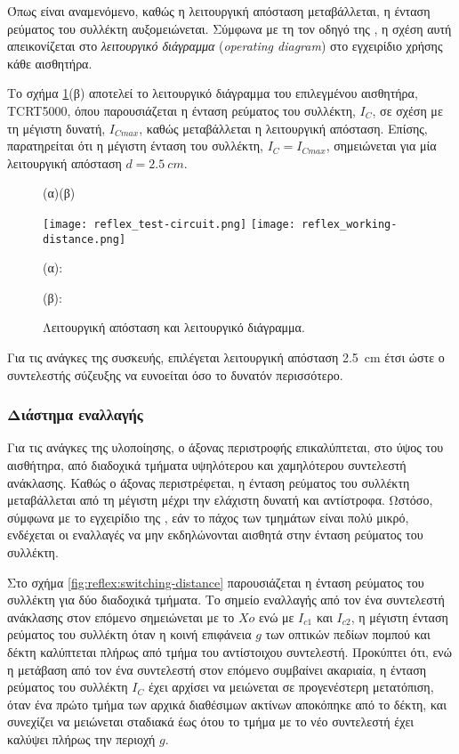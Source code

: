 Όπως είναι αναμενόμενο, καθώς η λειτουργική απόσταση μεταβάλλεται, η ένταση
ρεύματος του συλλέκτη αυξομειώνεται. Σύμφωνα με τη τον οδηγό της
\textcite{vishay06}, η σχέση αυτή απεικονίζεται στο \emph{λειτουργικό διάγραμμα}
 (\emph{operating diagram}) στο εγχειρίδιο χρήσης
κάθε αισθητήρα.

Το σχήμα \ref{fig:reflex:working-diagram}(β) αποτελεί το λειτουργικό διάγραμμα
του επιλεγμένου αισθητήρα, TCRT5000, όπου παρουσιάζεται η ένταση ρεύματος του
συλλέκτη, $I_{C}$, σε σχέση με τη μέγιστη δυνατή, $I_{Cmax}$, καθώς μεταβάλλεται
η λειτουργική απόσταση.
Επίσης, παρατηρείται ότι η μέγιστη ένταση του συλλέκτη, $I_{C} = I_{Cmax}$,
σημειώνεται για μία λειτουργική απόσταση $d = 2.5~cm$.

\begin{figure}
    \caption{Λειτουργική απόσταση και λειτουργικό διάγραμμα.
    \label{fig:reflex:working-diagram}}
    (α)\hfill(β)\hfill
    \begin{center}%
    \texttt{[image: reflex\_test-circuit.png]}%
    \texttt{[image: reflex\_working-distance.png]}%
    \end{center}

    (α): 

    (β): 
\end{figure}

Για τις ανάγκες της συσκευής, επιλέγεται λειτουργική απόσταση 2.5~cm έτσι ώστε ο
συντελεστής σύζευξης να ευνοείται όσο το δυνατόν περισσότερο.

\subsubsection{Διάστημα εναλλαγής}

Για τις ανάγκες της υλοποίησης, ο άξονας περιστροφής επικαλύπτεται, στο ύψος του
αισθήτηρα, από διαδοχικά τμήματα υψηλότερου και χαμηλότερου συντελεστή
ανάκλασης. Καθώς ο άξονας περιστρέφεται, η ένταση ρεύματος του συλλέκτη
μεταβάλλεται από τη μέγιστη μέχρι την ελάχιστη δυνατή και αντίστροφα.
Ωστόσο, σύμφωνα με το εγχειρίδιο της \textcite{vishay06}, εάν το πάχος των
τμημάτων είναι πολύ μικρό, ενδέχεται οι εναλλαγές να μην εκδηλώνονται αισθητά
στην ένταση ρεύματος του συλλέκτη.

Στο σχήμα \ref{fig:reflex:switching-distance} παρουσιάζεται η ένταση ρεύματος
του συλλέκτη για δύο διαδοχικά τμήματα.
Το σημείο εναλλαγής από τον ένα συντελεστή ανάκλασης στον επόμενο σημειώνεται
με το $Xo$ ενώ με $I_{c1}$ και $I_{c2}$, η μέγιστη ένταση ρεύματος του
συλλέκτη όταν η κοινή επιφάνεια $g$ των οπτικών πεδίων πομπού και δέκτη
καλύπτεται πλήρως από τμήμα του αντίστοιχου συντελεστή.
Προκύπτει ότι, ενώ η μετάβαση από τον ένα συντελεστή στον επόμενο συμβαίνει
ακαριαία, η ένταση ρεύματος του συλλέκτη $I_C$ έχει αρχίσει να μειώνεται σε
προγενέστερη μετατόπιση, όταν ένα πρώτο τμήμα των αρχικά διαθέσιμων ακτίνων
αποκόπηκε από το δέκτη, και συνεχίζει να μειώνεται σταδιακά έως ότου το τμήμα με
το νέο συντελεστή έχει καλύψει πλήρως την περιοχή $g$.

